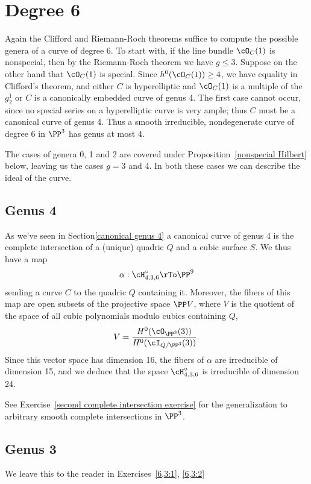 \section{Degree 6}

Again the Clifford and Riemann-Roch theorems suffice to compute the possible genera of a curve of degree 6. To start with,  if the line bundle $\cO_C(1)$ is nonspecial, then by the Riemann-Roch theorem we have $g \leq 3$. Suppose on the other hand that $\cO_C(1)$ is special. Since   $h^{0}(\cO_C(1)) \geq 4$, we have equality in Clifford's theorem, and either $C$ is hyperelliptic and $\cO_C(1)$ is a multiple of the $g^{1}_{2}$ or  $C$ is  a canonically embedded curve of genus 4. The first case cannot occur, since no special series on a hyperelliptic curve is very ample; thus $C$ must be a canonical curve of genus 4. Thus a smooth irreducible, nondegenerate curve of degree 6 in $\PP^3$ has genus at most 4.


The cases of genera 0, 1 and 2 are covered under Proposition~\ref{nonspecial Hilbert} below, leaving us the cases $g = 3$ and 4. In both these cases we can describe the ideal of the curve.

\subsection{Genus 4}

As we've seen in Section\ref{canonical genus 4} a canonical curve of genus 4 is the complete intersection of a (unique) quadric $Q$ and a cubic surface $S$. We thus have a map
$$
\alpha : \cH^\circ_{4,3,6} \rTo \PP^9
$$
sending a curve $C$ to the quadric $Q$ containing it. Moreover, the fibers of this map are open subsets of the projective space $\PP V$, where $V$ is the quotient of the space of all cubic polynomials modulo cubics containing $Q$, 
$$
V = \frac{H^0(\cO_{\PP^3}(3))}{H^0(\cI_{Q/\PP^3}(3))}.
$$
Since this vector space has dimension 16, the fibers of $\alpha$ are irreducible of dimension 15, and we deduce that the space $\cH^\circ_{4,3,6}$ is irreducible of dimension 24.

See Exercise~\ref{second complete intersection exercise} for the generalization to arbitrary smooth complete intersections in $\PP^3$.

\subsection{Genus 3}
We leave this to the reader in Exercises~\ref{6,3:1}, \ref{6,3:2}


